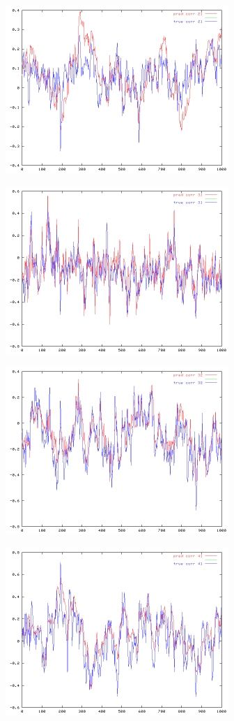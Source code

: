 {\includegraphics[height=2.5in, width=\textwidth]{example/corrplot21.png}

\includegraphics[height=2.5in, width=\textwidth]{example/corrplot31.png}


\includegraphics[height=2.5in, width=\textwidth]{example/corrplot32.png}

\includegraphics[height=2.5in, width=\textwidth]{example/corrplot41.png}

}

